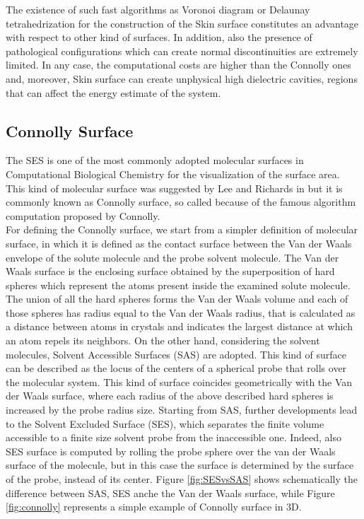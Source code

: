 \documentclass[11pt,a4paper]{article}
\begin{document}
The existence of such fast algorithms as Voronoi diagram or Delaunay tetrahedrization for the construction of the Skin surface constitutes an advantage with respect to other kind of surfaces. In addition, also the presence of pathological configurations which can create normal discontinuities are extremely limited. In any case, the computational costs are higher than the Connolly ones and, moreover, Skin surface can create unphysical high dielectric cavities, regions that can affect the energy estimate of the system.

\subsection{Connolly Surface}
\label{sec:connolly}
The SES is one of the most commonly adopted molecular surfaces in Computational Biological Chemistry for the visualization of the surface area. This kind of molecular surface was suggested by Lee and Richards in \cite{LeeRich} but it is commonly known as Connolly surface, so called because of the famous algorithm computation proposed by Connolly. \\
For defining the Connolly surface, we start from a simpler definition of molecular surface, in which it is defined as the contact surface between the Van der Waals envelope of the solute molecule and the probe solvent molecule. The Van der Waals surface is the enclosing surface obtained by the superposition of hard spheres which represent the atoms present inside the examined solute molecule. The union of all the hard spheres forms the Van der Waals volume and each of those spheres has radius equal to the Van der Waals radius, that is calculated as a distance between atoms in crystals and indicates the largest distance at which an atom repels its neighbors. 
On the other hand, considering the solvent molecules, Solvent Accessible Surfaces (SAS) are adopted. This kind of surface can be described as the locus of the centers of a spherical probe that rolls over the molecular system. This kind of surface coincides geometrically with the Van der Waals surface, where each radius of the above described hard spheres is increased by the probe radius size. 
Starting from SAS, further developments lead to the Solvent Excluded Surface (SES), which separates the finite volume accessible to a finite size solvent probe from the inaccessible one. Indeed, also SES surface is computed by rolling the probe sphere over the van der Waals surface of the molecule, but in this case the surface is determined by the surface of the probe, instead of its center. Figure \ref{fig:SESvsSAS} shows schematically the difference between SAS, SES anche the Van der Waals surface, while Figure \ref{fig:connolly} represents a simple example of Connolly surface in 3D. 
\end{document}
